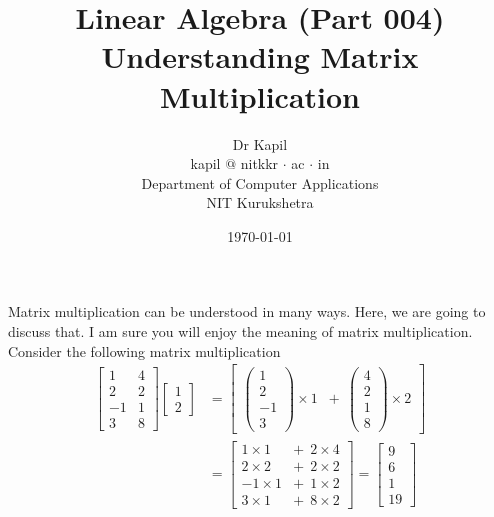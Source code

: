 \documentclass{article}
\title{Linear Algebra (Part 004)\\Understanding Matrix Multiplication}
\author{Dr Kapil\\kapil $@$ nitkkr $\cdot$ ac $\cdot$ in\\Department of Computer Applications\\ NIT Kurukshetra}
\date{\today}
\begin{document}
\maketitle
Matrix multiplication can be understood in many ways. Here, we are going to discuss that. I am sure you will enjoy the meaning of matrix multiplication. Consider the following matrix multiplication\\
\begin{align}
    \begin{bmatrix}
        1 & 4 \\ 2 & 2 \\ -1 & 1 \\ 3 & 8 
    \end{bmatrix} \begin{bmatrix}
        1 \\ 2
    \end{bmatrix} &= \begin{bmatrix}
        \begin{pmatrix}
            1\\   2\\
            -1\\
            3
        \end{pmatrix} \times 1 & + ~~\begin{pmatrix}
            4\\
            2\\
            1\\
            8
        \end{pmatrix} \times 2
    \end{bmatrix} \nonumber\\
    &= \begin{bmatrix}
    1 \times 1 &+~~ 2 \times 4 \\
    2 \times 2 &+~~ 2 \times 2\\
    -1 \times 1 &+~~ 1 \times 2\\
    3 \times 1 &+~~ 8 \times 2
    \end{bmatrix} = \begin{bmatrix}
        9\\
        6\\
        1\\
        19
    \end{bmatrix}\nonumber
\end{align}
\end{document}
